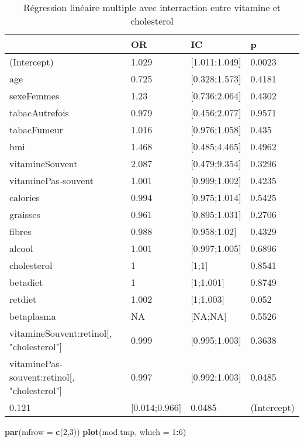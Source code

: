 \documentclass[]{article}
\newenvironment{Shaded}{\begin{snugshade}}{\end{snugshade}}
\newcommand{\KeywordTok}[1]{\textcolor[rgb]{0.13,0.29,0.53}{\textbf{#1}}}
\newcommand{\DataTypeTok}[1]{\textcolor[rgb]{0.13,0.29,0.53}{#1}}
\newcommand{\DecValTok}[1]{\textcolor[rgb]{0.00,0.00,0.81}{#1}}
\newcommand{\OperatorTok}[1]{\textcolor[rgb]{0.81,0.36,0.00}{\textbf{#1}}}
\newcommand{\NormalTok}[1]{#1}
\begin{document}
\begin{table}

\caption{\label{tab:unnamed-chunk-87}Régression linéaire multiple avec interraction entre vitamine et cholesterol}
\centering
\begin{tabular}[t]{l|l|l|l}
\hline
  & OR & IC & p\\
\hline
\rowcolor[HTML]{BBD2E1}  (Intercept) & 1.029 & [1.011;1.049] & 0.0023\\
\hline
age & 0.725 & [0.328;1.573] & 0.4181\\
\hline
\rowcolor[HTML]{BBD2E1}  sexeFemmes & 1.23 & [0.736;2.064] & 0.4302\\
\hline
tabacAutrefois & 0.979 & [0.456;2.077] & 0.9571\\
\hline
\rowcolor[HTML]{BBD2E1}  tabacFumeur & 1.016 & [0.976;1.058] & 0.435\\
\hline
bmi & 1.468 & [0.485;4.465] & 0.4962\\
\hline
\rowcolor[HTML]{BBD2E1}  vitamineSouvent & 2.087 & [0.479;9.354] & 0.3296\\
\hline
vitaminePas-souvent & 1.001 & [0.999;1.002] & 0.4235\\
\hline
\rowcolor[HTML]{BBD2E1}  calories & 0.994 & [0.975;1.014] & 0.5425\\
\hline
graisses & 0.961 & [0.895;1.031] & 0.2706\\
\hline
\rowcolor[HTML]{BBD2E1}  fibres & 0.988 & [0.958;1.02] & 0.4329\\
\hline
alcool & 1.001 & [0.997;1.005] & 0.6896\\
\hline
\rowcolor[HTML]{BBD2E1}  cholesterol & 1 & [1;1] & 0.8541\\
\hline
betadiet & 1 & [1;1.001] & 0.8749\\
\hline
\rowcolor[HTML]{BBD2E1}  retdiet & 1.002 & [1;1.003] & 0.052\\
\hline
betaplasma & NA & [NA;NA] & 0.5526\\
\hline
\rowcolor[HTML]{BBD2E1}  vitamineSouvent:retinol[, "cholesterol"] & 0.999 & [0.995;1.003] & 0.3638\\
\hline
vitaminePas-souvent:retinol[, "cholesterol"] & 0.997 & [0.992;1.003] & 0.0485\\
\hline
\rowcolor[HTML]{BBD2E1}  0.121 & [0.014;0.966] & 0.0485 & (Intercept)\\
\hline
\end{tabular}
\end{table}

\begin{Shaded}
\begin{Highlighting}[]
\KeywordTok{par}\NormalTok{(}\DataTypeTok{mfrow =} \KeywordTok{c}\NormalTok{(}\DecValTok{2}\NormalTok{,}\DecValTok{3}\NormalTok{))}
\KeywordTok{plot}\NormalTok{(mod.tmp, }\DataTypeTok{which =} \DecValTok{1}\OperatorTok{:}\DecValTok{6}\NormalTok{)}
\end{Highlighting}
\end{Shaded}
\end{document}
